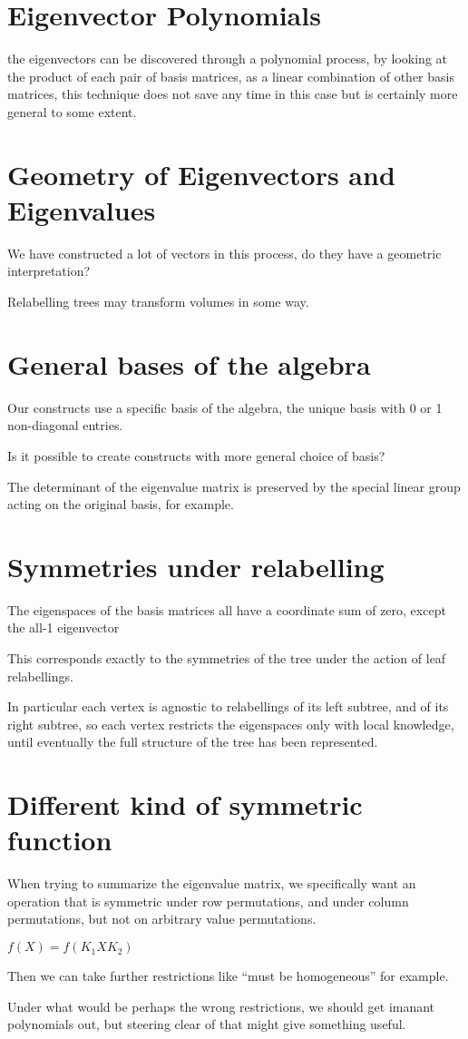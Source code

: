 \documentclass[10pt,a4paper]{report}
\begin{document}
\section{Eigenvector Polynomials}

the eigenvectors can be discovered through a polynomial process, by looking at
the product of each pair of basis matrices, as a linear combination of other
basis matrices, this technique does not save any time in this case but is certainly more general to some extent.

\section{Geometry of Eigenvectors and Eigenvalues}

We have constructed a lot of vectors in this process, do they have a geometric interpretation?

Relabelling trees may transform volumes in some way.

\section{General bases of the algebra}

Our constructs use a specific basis of the algebra, the unique basis with 0 or 1 non-diagonal entries.

Is it possible to create constructs with more general choice of basis?

The determinant of the eigenvalue matrix is preserved by the special linear group acting on the original basis, for example.

\section{Symmetries under relabelling}

The eigenspaces of the basis matrices all have a coordinate sum of zero, except the all-1
eigenvector

This corresponds exactly to the symmetries of the tree under the action of leaf
relabellings.

In particular each vertex is agnostic to relabellings of its left subtree, and of
its right subtree, so each vertex restricts the eigenspaces only with local
knowledge, until eventually the full structure of the tree has been
represented.

\section{Different kind of symmetric function}

When trying to summarize the eigenvalue matrix, we specifically want an
operation that is symmetric under row permutations, and under column
permutations, but not on arbitrary value permutations.

$f(X) = f(K_1XK_2)$

Then we can take further restrictions like ``must be homogeneous'' for example.

Under what would be perhaps the wrong restrictions, we should get imanant polynomials out, but
steering clear of that might give something useful.
\end{document}
